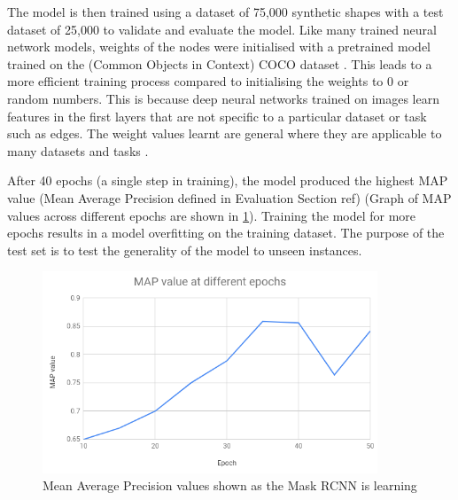 The model is then trained using a dataset of 75,000 synthetic shapes with a test dataset of 25,000 to validate and evaluate the model. Like many trained neural network models, weights of the nodes were initialised with a pretrained model trained on the (Common Objects in Context) COCO dataset \cite{lin2014microsoft}. This leads to a more efficient training process compared to initialising the weights to 0 or random numbers. This is because deep neural networks trained on images learn features in the first layers that are not specific to a particular dataset or task such as edges. The weight values learnt are general where they are applicable to many datasets and tasks \cite{yosinski2014transferable}.

After 40 epochs (a single step in training), the model produced the highest MAP value (Mean Average Precision defined in Evaluation Section ref) (Graph of MAP values across different epochs are shown in \ref{fig:epoch}). Training the model for more epochs results in a model overfitting on the training dataset. The purpose of the test set is to test the generality of the model to unseen instances.

\begin{figure}[H]
	\begin{center}
		\includegraphics[width=100mm, scale=1]{epoch_training.png}
		\caption{Mean Average Precision values shown as the Mask RCNN is learning}
		\label{fig:epoch}
	\end{center}
	
\end{figure}
 
